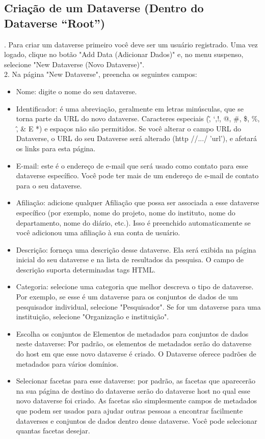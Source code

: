 \documentclass[12pt,hidelinks]{article}
\begin{document}
\newpage

\subsection{Criação de um Dataverse (Dentro do Dataverse “Root”)}
    
. Para criar um dataverse primeiro você deve ser um usuário registrado. Uma vez logado, clique no botão "Add Data (Adicionar Dados)" e, no menu suspenso, selecione "New Dataverse (Novo Dataverse)".\\

2. Na página "New Dataverse", preencha os seguintes campos:

\begin{itemize}

 \item Nome: digite o nome do seu dataverse.
 \item Identificador: é uma abreviação, geralmente em letras minúsculas, que se torna parte da URL do novo dataverse. Caracteres especiais (\~, `,!, @, \#, \$, \%, \^, \& E *) e espaços não são permitidos. Se você alterar o campo URL do Dataverse, o URL do seu Dataverse será alterado (http //.../ 'url'), e afetará os links para esta página. 
 
 \item E-mail: este é o endereço de e-mail que será usado como contato para esse dataverse específico. Você pode ter mais de um endereço de e-mail de contato para o seu dataverse.
\item Afiliação: adicione qualquer Afiliação que possa ser associada a esse dataverse específico (por exemplo, nome do projeto, nome do instituto, nome do departamento, nome do diário, etc.). Isso é preenchido automaticamente se você adicionou uma afiliação à sua conta de usuário.
\item Descrição: forneça uma descrição desse dataverse. Ela será exibida na página inicial do seu dataverse e na lista de resultados da pesquisa. O campo de descrição suporta determinadas tags HTML.
\item  Categoria: selecione uma categoria que melhor descreva o tipo de dataverse. Por exemplo, se esse é um dataverse para os conjuntos de dados de um pesquisador individual, selecione "Pesquisador". Se for um dataverse para uma instituição, selecione "Organização e instituição".
\item  Escolha os conjuntos de Elementos de metadados para conjuntos de dados neste dataverse: Por padrão, os elementos de metadados serão do dataverse do host em que esse novo dataverse é criado. O Dataverse oferece padrões de metadados para vários domínios.
\item Selecionar facetas para esse dataverse: por padrão, as facetas que aparecerão na sua página de destino do dataverse serão do dataverse host no qual esse novo dataverse foi criado. As facetas são simplesmente campos de metadados que podem ser usados para ajudar outras pessoas a encontrar facilmente dataverses e conjuntos de dados dentro desse dataverse. Você pode selecionar quantas facetas desejar.

 \end{itemize}
 
\end{document}
